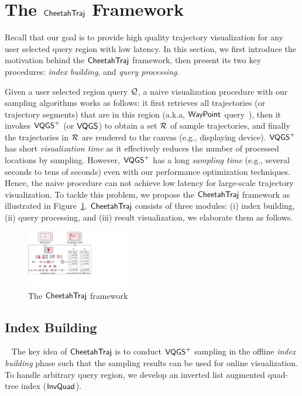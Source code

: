 \section{The $\mathsf{CheetahTraj}$ Framework}\label{sec:cheetahtraj}
Recall that our goal is to provide high quality trajectory visualization for any user selected query region with low latency.
In this section, we first introduce the motivation behind the $\mathsf{CheetahTraj}$ framework, then present its two key procedures: \textit{index building}, and \textit{query processing}.

Given a user selected region query $\mathcal{Q}$, a naive visualization procedure with our sampling algorithms works as follows:
it first retrieves all trajectories (or trajectory segments) that are in this region (a.k.a, $\mathsf{WayPoint}$ query~\cite{kruger2013trajectorylenses}),
then it invokes $\mathsf{VQGS}^+$ (or $\mathsf{VQGS}$) to obtain a set $\mathcal{R}$ of sample trajectories, and finally the trajectories in $\mathcal{R}$ are rendered to the canvas (e.g., displaying device).
$\mathsf{VQGS}^+$ has short \textit{visualization time} as it effectively reduces the number of processed locations by sampling. However, $\mathsf{VQGS}^+$ has a long \textit{sampling time} (e.g., several seconds to tens of seconds) even with our performance optimization techniques.
Hence, the naive procedure can not achieve low latency for large-scale trajectory visualization. To tackle this problem, we propose the $\mathsf{CheetahTraj}$ framework as illustrated in Figure~\ref{fig:framework}.  $\mathsf{CheetahTraj}$ consists of three modules: (i) \textsf{index building}, (ii) \textsf{query processing}, and (iii) \textsf{result visualization}, we elaborate them as follows.


\begin{figure}
	\centering
	\includegraphics[width=0.4\textwidth]{pictures/cheetahtraj}
    \trim
    \caption{The $\mathsf{CheetahTraj}$ framework}
    \label{fig:framework}
    \trim
\end{figure}


\subsection{Index Building}~\label{sec:index}
The key idea of $\mathsf{CheetahTraj}$ is to conduct $\mathsf{VQGS}^+$ sampling in the offline \emph{index building} phase such that the sampling results can be used for online visualization. To handle arbitrary query region, we develop an inverted list augmented quad-tree index ($\mathsf{InvQuad}$).


